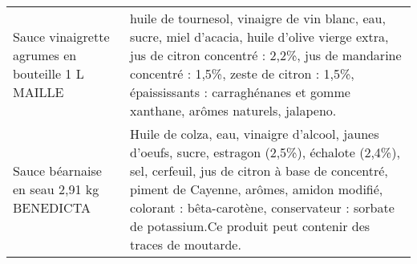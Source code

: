 \begin{longtable}{p{5cm}p{10cm}}
                                                        Sauce vinaigrette agrumes en bouteille 1 L MAILLE &                                                                                                                                                                                                                                                                                                                                                                                                                                                                                                                                                                                                                                                                                                                                                                 huile de tournesol, vinaigre de vin blanc, eau, sucre, miel d'acacia, huile d'olive vierge extra, jus de citron concentré : 2,2\%, jus de mandarine concentré : 1,5\%, zeste de citron : 1,5\%, épaississants : carraghénanes et gomme xanthane, arômes naturels, jalapeno. \\
                                                                Sauce béarnaise en seau 2,91 kg BENEDICTA &                                                                                                                                                                                                                                                                                                                                                                                                                                                                                                                                                                                                                                                                                                                             Huile de colza, eau, vinaigre d'alcool, jaunes d'oeufs, sucre, estragon (2,5\%), échalote (2,4\%), sel, cerfeuil, jus de citron à base de concentré, piment de Cayenne, arômes, amidon modifié, colorant : bêta-carotène, conservateur : sorbate de potassium.Ce produit peut contenir des traces de moutarde. \\

\end{longtable}
